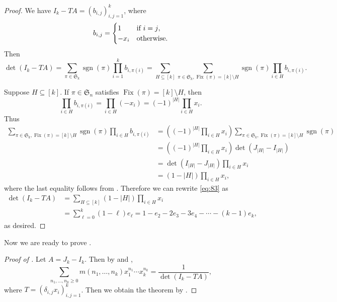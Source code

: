 \documentclass[oneside]{book}
\numberwithin{equation}{section}
\theoremstyle{definition}
\newcommand\Fix{\operatorname{Fix}}
\newcommand\sgn{\operatorname{sgn}}
\newcommand\sym{\mathfrak{S}}
\begin{document}
\begin{proof}
  We have \( I_{k}-TA = (b_{i,j})_{i,j=1}^k \),
  where 
  \[
    b_{i,j} =
    \begin{cases}
     1 & \mbox{if \( i=j \)},\\
     -x_i & \mbox{otherwise.}
    \end{cases}
  \]
  Then
  \begin{equation}\label{eq:83}
        \det(I_{k}-TA)
    = \sum_{\pi\in \sym_k}  \sgn(\pi) \prod_{i=1}^k b_{i,\pi(i)}
     = \sum_{H\subseteq [k]}\sum_{\pi\in \sym_k, \Fix(\pi) = [k]\setminus H}  \sgn(\pi)
      \prod_{i\in H} b_{i,\pi(i)}.
  \end{equation}

  Suppose \( H\subseteq [k] \). If \( \pi\in \sym_n \) satisfies
  \( \Fix(\pi) = [k]\setminus H \), then
  \[
    \prod_{i\in H} b_{i,\pi(i)} = \prod_{i\in H} (-x_i) = (-1)^{|H|}  \prod_{i\in H} x_i.
  \]
  Thus
  \begin{align*}
    \sum_{\pi\in \sym_k, \Fix(\pi) = [k]\setminus H}  \sgn(\pi) \prod_{i\in H} b_{i,\pi(i)} 
   &= \left( (-1)^{|H|} \prod_{i\in H} x_i \right)
    \sum_{\pi\in \sym_k, \Fix(\pi) = [k]\setminus H}  \sgn(\pi) \\
  &=  \left( (-1)^{|H|} \prod_{i\in H} x_i \right) \det(J_{|H|}-I_{|H|})\\
  &=   \det(I_{|H|}-J_{|H|}) \prod_{i\in H} x_i\\
  &=   (1-|H|)\prod_{i\in H} x_i,
  \end{align*}
  where the last equality follows from . Therefore we can
  rewrite \eqref{eq:83} as
  \begin{align*}
    \det(I_{k}-TA)
    &= \sum_{H\subseteq [k]} (1-|H|) \prod_{i\in H} x_i\\
    &= \sum_{\ell=0}^{k} (1-\ell) e_\ell = 1-e_2-2e_3-3e_4-\cdots-(k-1)e_k,
  \end{align*}
  as desired.
\end{proof}

Now we are ready to prove .

\begin{proof}[Proof of ]
  Let \( A = J_k-I_k \). Then by  and ,
\[
  \sum_{n_1,\dots,n_k\geq0} m(n_1,\dots,n_k) x_1^{n_1} \cdots
  x_k^{n_k} = {\frac {1}{\det(I_{k}-TA)}},
\]
where \( T = (\delta_{i,j}x_i)_{i,j=1}^k \). Then we obtain the
theorem by .
\end{proof}

\newpage
\end{document}
